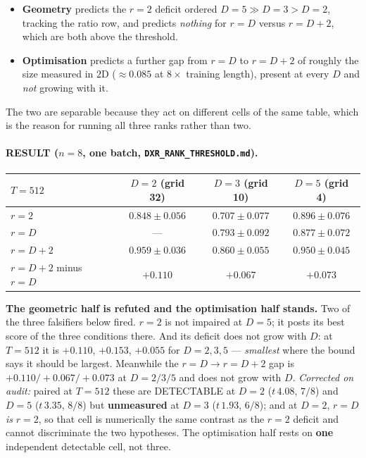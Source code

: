 \documentclass[11pt]{article}
\begin{document}
\begin{itemize}\itemsep2pt
\item \textbf{Geometry} predicts the $r{=}2$ deficit ordered $D{=}5 \gg D{=}3 >
  D{=}2$, tracking the ratio row, and predicts \emph{nothing} for $r=D$ versus
  $r=D{+}2$, which are both above the threshold.
\item \textbf{Optimisation} predicts a further gap from $r=D$ to $r=D{+}2$ of
  roughly the size measured in $2$D ($\approx 0.085$ at $8\times$ training length),
  present at every $D$ and \emph{not} growing with it.
\end{itemize}

\noindent The two are separable because they act on different cells of the same
table, which is the reason for running all three ranks rather than two.

\paragraph{RESULT ($n=8$, one batch, \texttt{DXR\_RANK\_THRESHOLD.md}).}

\begin{center}\small
\begin{tabular}{lccc}
\toprule
$T=512$ & $D=2$ (grid 32) & $D=3$ (grid 10) & $D=5$ (grid 4) \\
\midrule
$r=2$        & $0.848 \pm 0.056$ & $0.707 \pm 0.077$ & $\mathbf{0.896 \pm 0.076}$ \\
$r=D$        & ---               & $0.793 \pm 0.092$ & $0.877 \pm 0.072$ \\
$r=D{+}2$    & $0.959 \pm 0.036$ & $0.860 \pm 0.055$ & $0.950 \pm 0.045$ \\
\midrule
$r{=}D{+}2$ minus $r{=}D$ & $+0.110$ & $+0.067$ & $+0.073$ \\
\bottomrule
\end{tabular}
\end{center}

\noindent \textbf{The geometric half is refuted and the optimisation half
stands.} Two of the three falsifiers below fired. $r=2$ is not impaired at $D=5$;
it posts its best score of the three conditions there. And its deficit does not
grow with $D$: at $T{=}512$ it is $+0.110$, $+0.153$, $+0.055$ for $D=2,3,5$ ---
\emph{smallest} where the bound says it should be largest. Meanwhile the
$r{=}D \to r{=}D{+}2$ gap is $+0.110 / +0.067 / +0.073$ at $D=2/3/5$ and does not
grow with $D$. \emph{Corrected on audit:} paired at $T{=}512$ these are
DETECTABLE at $D{=}2$ ($t\,4.08$, $7/8$) and $D{=}5$ ($t\,3.35$, $8/8$) but
\textbf{unmeasured} at $D{=}3$ ($t\,1.93$, $6/8$); and at $D{=}2$, $r{=}D$
\emph{is} $r{=}2$, so that cell is numerically the same contrast as the $r{=}2$
deficit and cannot discriminate the two hypotheses. The optimisation half rests
on \textbf{one} independent detectable cell, not three.
\end{document}
